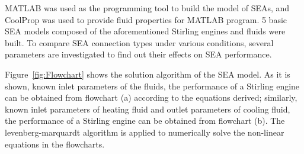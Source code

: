 \documentclass[preprint,5p, twocolumn]{elsarticle}
\begin{document}



MATLAB was used as the programming tool to build the model of SEAs, and CoolProp was used to provide fluid properties for MATLAB program. 5 basic SEA models composed of the aforementioned Stirling engines and fluids were built. To compare SEA connection types under various conditions, several parameters are investigated to find out their effects on SEA performance.

Figure~\ref{fig:Flowchart} shows the solution algorithm of the SEA model. As it is shown, known inlet parameters of the fluids, the performance of a Stirling engine can be obtained from flowchart (a) according to the equations derived; similarly, known inlet parameters of heating fluid and outlet parameters of cooling fluid, the performance of a Stirling engine can be obtained from flowchart (b). The levenberg-marquardt algorithm is applied to numerically solve the non-linear equations in the flowcharts.
\end{document}
